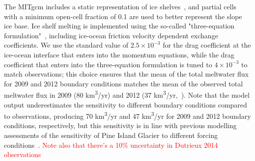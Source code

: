 \documentclass[draft]{agujournal2019}
\newcommand{\red}[1]{\textcolor{red}{#1}}
\begin{document}
The MITgcm includes a static representation of ice shelves~\cite{Losch2008JGeophysResOceans}, and partial cells with a minimum open-cell fraction of 0.1 are used to better represent the slope ice base. Ice shelf melting is implemented using the so-called "three-equation formulation"~\cite{Holland1999JPhysOcean}, including ice-ocean friction velocity dependent exchange coefficients. We use the standard value of $2.5\times10^{-3}$ for the drag coefficient at the ice-ocean interface that enters into the momentum equations, while the drag coefficient that enters into the three-equation formulation is tuned to $4\times10^{-3}$ to match observations; this choice ensures that the mean of the total meltwater flux for 2009 and 2012 boundary conditions matches the mean of the observed total meltwater flux in 2009 (80 km\textsuperscript{3}/yr) and 2012 (37 km\textsuperscript{3}/yr,~\cite{Dutrieux2014Science}). Note that the model output underestimates the sensitivity to different boundary conditions compared to observations, producing 70 km\textsuperscript{3}/yr and 47 km\textsuperscript{3}/yr for 2009 and 2012 boundary conditions, respectively, but this sensitivity is in line with previous modelling assessments of the sensitivity of Pine Island Glacier to different forcing conditions~\cite{Dutrieux2014Science, DeRydt2014JGeophysResOceans}. \red{Note also that there's a 10\% uncertainty in Dutrieux 2014 observations}

\end{document}
